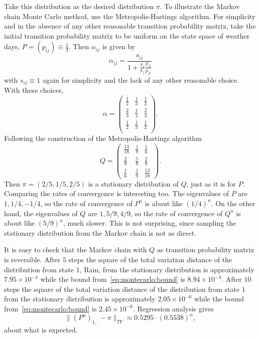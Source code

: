\documentclass[12pt]{article}
\begin{document}
Take this distribution as the desired distribution \( \pi \).  To
illustrate the Markov chain Monte Carlo method, use the
Metropolis-Hastings algorithm.  For simplicity and in the absence of any
other reasonable transition probability matrix, take the initial
transition probability matrix to be uniform on the state space of
weather days, \( P = (p_{ij}) \equiv \frac{1}{3} \).  Then \( \alpha_{ij}
\) is given by
\[
    \alpha_{ij} = \frac{s_{ij}}{1 + \frac{\pi_i}{\pi_j} \frac{p_{ij}}{p_
    {ji}}}
\] with \( s_{ij} \equiv 1 \) again for simplicity and the lack of any
other reasonable choice.  With these choices,
\[
    \alpha =
    \begin{pmatrix}
        \frac{1}{2} & \frac{1}{3} & \frac{1}{2} \\
        \frac{2}{3} & \frac{1}{2} & \frac{2}{3} \\
        \frac{1}{2} & \frac{1}{3} & \frac{1}{2} \\
    \end{pmatrix}
    .
\] Following the construction of the Metropolis-Hastings algorithm
\[
    Q =
    \begin{pmatrix}
        \frac{13}{18} & \frac{1}{9} & \frac{1}{6} \\
        \frac{2}{9} & \frac{5}{9} & \frac{2}{9} \\
        \frac{1}{6} & \frac{1}{9} & \frac{13}{18}
    \end{pmatrix}
    .
\] Then \( \pi = (2/5, 1/5, 2/5) \) is a stationary distribution of \( Q
\), just as it is for \( P \).  Comparing the rates of convergence is
interesting too.  The eigenvalues of \( P \) are \( 1, 1/4, -1/4 \), so
the rate of convergence of \( P^n \) is about like \( (1/4)^n \).  On
the other hand, the eigenvalues of \( Q \) are \( 1, 5/9, 4/9 \), so the
rate of convergence of \( Q^{n} \) is about like \( (5/9)^n \), much
slower.  This is not surprising, since sampling the stationary
distribution from the Markov chain is not as direct.

It is easy to check that the Markov chain with \( Q \) as transition
probability matrix is reversible. After \( 5 \) steps the square of the
total variation distance of the distribution from state \( 1 \), Rain,
from the stationary distribution is approximately \( 7.95 \times 10^{-4}
\) while the bound from~\eqref{eq:montecarlo:bound} is \( 8.94 \times 10^
{-4} \). After \( 10 \) steps the square of the total variation distance
of the distribution from state \( 1 \) from the stationary distribution
is approximately \( 2.05 \times 10^{-6} \) while the bound from~\eqref{eq:montecarlo:bound}
is \( 2.45 \times 10^{-6} \). Regression analysis gives
\[
    \| (P^n)_{1, \cdot} - \pi \|_{TV} \approx 0.5295 \cdot (0.5538)^n,
\] about what is expected.
\end{document}
